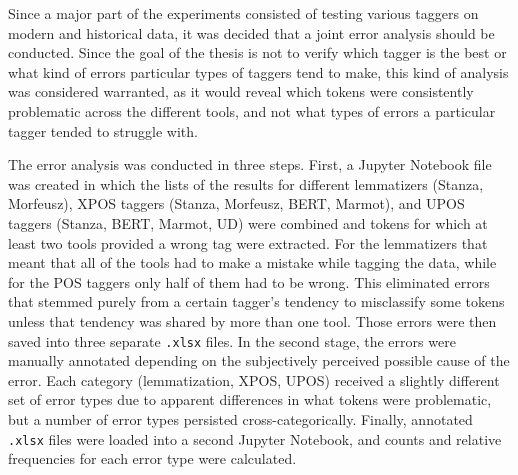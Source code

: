 Since a major part of the experiments consisted of testing various taggers on modern and historical data, it was decided that a joint error analysis should be conducted. Since the goal of the thesis is not to verify which tagger is the best or what kind of errors particular types of taggers tend to make, this kind of analysis was considered warranted, as it would reveal which tokens were consistently problematic across the different tools, and not what types of errors a particular tagger tended to struggle with.

The error analysis was conducted in three steps. First, a Jupyter Notebook file was created in which the lists of the results for different lemmatizers (Stanza, Morfeusz), XPOS taggers (Stanza, Morfeusz, BERT, Marmot), and UPOS taggers (Stanza, BERT, Marmot, UD) were combined and tokens for which at least two tools provided a wrong tag were extracted. For the lemmatizers that meant that all of the tools had to make a mistake while tagging the data, while for the POS taggers only half of them had to be wrong. This eliminated errors that stemmed purely from a certain tagger's tendency to misclassify some tokens unless that tendency was shared by more than one tool. Those errors were then saved into three separate \texttt{.xlsx} files. In the second stage, the errors were manually annotated depending on the subjectively perceived possible cause of the error. Each category (lemmatization, XPOS, UPOS) received a slightly different set of error types due to apparent differences in what tokens were problematic, but a number of error types persisted cross-categorically. Finally, annotated \texttt{.xlsx} files were loaded into a second Jupyter Notebook, and counts and relative frequencies for each error type were calculated. 
